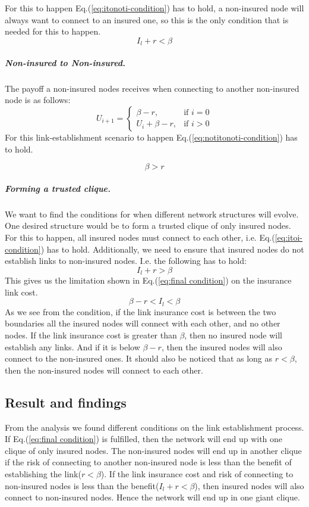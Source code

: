 For this to happen Eq.(\ref{eq:itonoti-condition}) has to hold, a non-insured node will always want to connect to an insured one, so this is the only condition that is needed for this to happen.
\begin{equation}
I_{l}+r<\beta
\label{eq:itonoti-condition}
\end{equation}
\subparagraph{Non-insured to Non-insured.}
The payoff a non-insured nodes receives when connecting to another non-insured node is as follows:
\begin{equation}
    U_{i+1}= 
\begin{cases}
    \beta -r,& \text{if } i = 0\\
    U_{i}+\beta -r,& \text{if }  i>0
   
\end{cases}
\label{eq:notitonotimodel2}
\end{equation}
For this link-establishment scenario to happen Eq.(\ref{eq:notitonoti-condition}) has to hold.

\begin{equation}
\beta>r
\label{eq:notitonoti-condition}
\end{equation}

\subparagraph{Forming a trusted clique.}
We want to find the conditions for when different network structures will evolve. One desired structure would be to form a trusted clique of only insured nodes. For this to happen, all insured nodes must connect to each other, i.e. Eq.(\ref{eq:itoi-condition}) has to hold. Additionally, we need to ensure that insured nodes do not establish links to non-insured nodes. I.e. the following has to hold:
\begin{equation}
I_{l}+r>\beta
\end{equation}
This gives us the limitation shown in Eq.(\ref{eq:final condition}) on the insurance link cost.
\begin{equation}
\beta-r<I_{l}<\beta
\label{eq:final condition}
\end{equation}
As we see from the condition, if the link insurance cost is between the two boundaries all the insured nodes will connect with each other, and no other nodes. If the link insurance cost is greater than $\beta$, then no insured node will establish any links. And if it is below $\beta-r$, then the insured nodes will also connect to the non-insured ones.
It should also be noticed that as long as $r<\beta$, then the non-insured nodes will connect to each other. 

\subsection{Result and findings}
From the analysis we found different conditions on the link establishment process. If Eq.(\ref{eq:final condition}) is fulfilled, then the network will end up with one clique of only insured nodes. The non-insured nodes will end up in another clique if the risk of connecting to another non-insured node is less than the benefit of establishing the link($r<\beta$).
If the link insurance cost and risk of connecting to non-insured nodes is less than the benefit($I_{l}+r<\beta$), then insured nodes will also connect to non-insured nodes. Hence the network will end up in one giant clique.

